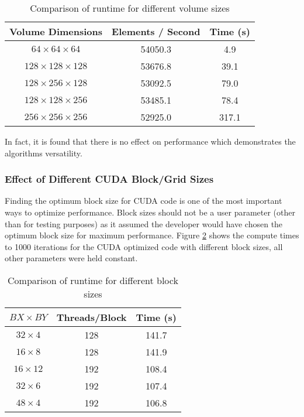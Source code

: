 \begin{table}[h]
\centering
\begin{tabular}{ | c | c | c | }
	\hline
	Volume Dimensions  & Elements / Second & Time (s)\\ \hline
  $64 \times 64 \times 64  $	 & 54050.3			& 4.9 \\
  $128 \times 128 \times 128  $&	53676.8		& 39.1 \\
  $128 \times 256 \times 128  $& 53092.5   & 79.0 \\
  $128 \times 128 \times 256  $&	53485.1   & 78.4  \\
  $256 \times 256 \times 256  $&	52925.0   & 317.1  \\
  \hline
\end{tabular}\caption{Comparison of runtime for different volume sizes}
\label{table:dimensions3d}
\end{table}

In fact, it is found that there is no effect on performance which demonstrates the algorithms versatility. 

\subsubsection{Effect of Different CUDA Block/Grid Sizes}\label{blocksizes}

Finding the optimum block size for CUDA code is one of the most important ways to optimize performance. Block sizes should not be a user parameter (other than for testing purposes) as it assumed the developer would have chosen the optimum block size for maximum performance. Figure \ref{table:blocksizes} shows the compute times to 1000 iterations for the CUDA optimized code with different block sizes, all other parameters were held constant. 

\begin{table}[h]
\centering
\begin{tabular}{ | c | c | c | }
	\hline
	$BX \times BY$  & Threads/Block & Time (s) \\ \hline
  $32 \times 4$	 &128			& 141.7 \\
  $16 \times 8$	 &128			& 141.9 \\
  $16 \times 12$ &192 & 108.4 \\
  $32 \times 6$	 &192   & 107.4  \\
  $48 \times 4$	 &192  & 106.8  \\
  \hline
\end{tabular}\caption{Comparison of runtime for different block sizes}
\label{table:blocksizes}
\end{table}

